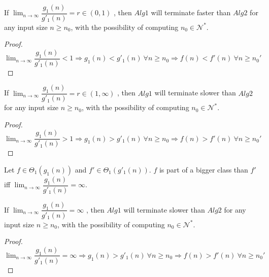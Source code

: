 \begin{lemma}
    If  $ \lim_{n\to\infty} \dfrac{g_{1}(n)}{g'_{1}(n)} = r \in (0,1) $ , then $Alg1$ will terminate faster than $Alg2$ for any input size $n \geq n_{0}$, with the possibility of computing $n_{0} \in \mathcal{N}^{*}$.
\end{lemma}
\begin{proof}
    $\lim_{n\to\infty} \dfrac{g_{1}(n)}{g'_{1}(n)} < 1 \Rightarrow g_{1}(n) < g'_{1}(n)\ \forall n \geq n_{0} \Rightarrow f(n) < f'(n) \ \forall n \geq n_{0}'$
\end{proof}

\begin{lemma}
    If  $ \lim_{n\to\infty} \dfrac{g_{1}(n)}{g'_{1}(n)} = r \in (1,\infty) $ , then $Alg1$ will terminate slower than $Alg2$ for any input size $n \geq n_{0}$, with the possibility of computing $n_{0} \in \mathcal{N}^{*}$.
\end{lemma}
\begin{proof}
    $\lim_{n\to\infty} \dfrac{g_{1}(n)}{g'_{1}(n)} > 1 \Rightarrow g_{1}(n) > g'_{1}(n)\ \forall n \geq n_{0} \Rightarrow f(n) > f'(n) \ \forall n \geq n_{0}'$
\end{proof}



\begin{definition}
    Let $f \in \Theta_{1}(g_{1}(n))$ and $f' \in \Theta_{1}(g'_{1}(n))$. $f$ is part of a bigger class than $f'$ iff $\lim_{n\to\infty} \dfrac{g_{1}(n)}{g'_{1}(n)} = \infty$.
\end{definition}
\begin{lemma}
    If  $ \lim_{n\to\infty} \dfrac{g_{1}(n)}{g'_{1}(n)} = \infty $ , then $Alg1$ will terminate slower than $Alg2$ for any input size $n \geq n_{0}$, with the possibility of computing $n_{0} \in \mathcal{N}^{*}$.
\end{lemma}
\begin{proof}
    $\lim_{n\to\infty} \dfrac{g_{1}(n)}{g'_{1}(n)} = \infty \Rightarrow g_{1}(n) > g'_{1}(n)\ \forall n \geq n_{0} \Rightarrow f(n) > f'(n) \ \forall n \geq n_{0}'$
\end{proof}


